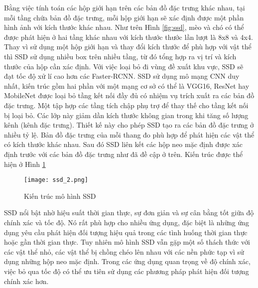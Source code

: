 \documentclass[../the.tex]{subfiles}
\begin{document}
{\fontsize{13}{12} \selectfont

Bằng việc tính toán các hộp giới hạn trên các bản đồ đặc trưng khác nhau, tại mỗi tầng chứa bản đồ đặc trưng, mỗi hộp giới hạn sẽ xác định được một phần hình ảnh với kích thước khác nhau. Như trên Hình \ref{fig:ssd}, mèo và chó có thể được phát hiện ở hai tầng khác nhau với kích thước thước lần lượt là 8x8 và 4x4. Thay vì sử dụng một hộp giới hạn và thay đổi kích thước để phù hợp với vật thể thì SSD sử dụng nhiều box trên nhiều tầng, từ đó tổng hợp ra vị trí và kích thước của hộp cần xác định. Với việc loại bỏ đi vùng đề xuất khu vực, SSD sẽ đạt tốc độ xử lí cao hơn các Faster-RCNN.
SSD sử dụng mô mạng CNN duy nhất, kiến trúc gồm hai phần với một mạng cơ sở có thể là VGG16, ResNet hay MobileNet được loại bỏ tầng kết nối đầy đủ có nhiệm vụ trích xuất ra các bản đồ đặc trưng.
Một tập hợp các tầng tích chập phụ trợ để thay thế cho tầng kết nối bị loại bỏ. Các lớp này giảm dần kích thước không gian trong khi tăng số lượng kênh (kênh đặc trưng). Thiết kế này cho phép SSD tạo ra các bản đồ đặc trưng ở nhiều tỷ lệ. Bản đồ đặc trưng của mỗi thang đo phù hợp để phát hiện các vật thể có kích thước khác nhau.
Sau đó SSD liên kết các hộp neo mặc định được xác định trước với các bản đồ đặc trưng như đã đề cập ở trên.
Kiến trúc được thể hiện ở Hình \ref{fig:ssd2}

}

\begin{figure}[H]
	\centering
	\texttt{[image: ssd\_2.png]}
	\caption{Kiến trúc mô hình SSD \cite{Liu_2016}}
	\label{fig:ssd2}
\end{figure}

{\fontsize{13}{12} \selectfont

SSD nổi bật nhờ hiệu suất thời gian thực, sự đơn giản và sự cân bằng tốt giữa độ chính xác và tốc độ. Nó rất phù hợp cho nhiều ứng dụng, đặc biệt là những ứng dụng yêu cầu phát hiện đối tượng hiệu quả trong các tình huống thời gian thực hoặc gần thời gian thực.
Tuy nhiên mô hình SSD vẫn gặp một số thách thức với các vật thể nhỏ, các vật thể bị chồng chéo lên nhau với các nền phức tạp vì sử dụng những hộp neo mặc định.
Trong các ứng dụng quan trọng về độ chính xác, việc bỏ qua tốc độ có thể ưu tiên sử dụng các phương pháp phát hiện đối tượng chính xác hơn.

}
\end{document}
